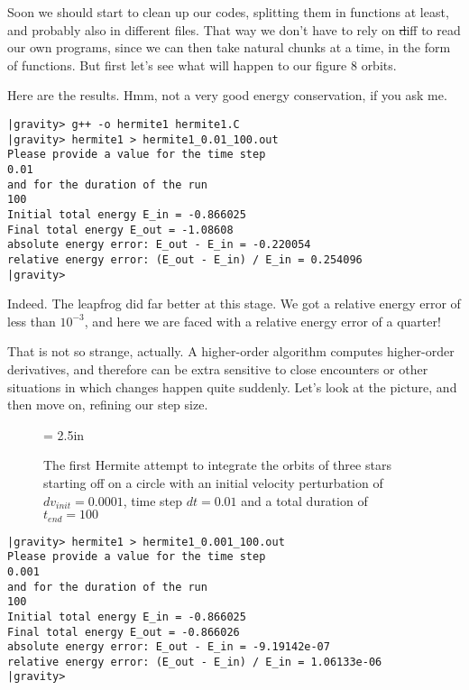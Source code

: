 \alice
Soon we should start to clean up our codes, splitting them in
functions at least, and probably also in different files.  That way we
don't have to rely on {\st diff} to read our own programs, since we
can then take natural chunks at a time, in the form of functions.  But
first let's see what will happen to our figure 8 orbits.

\bob
Here are the results.  Hmm, not a very good energy conservation, if
you ask me.

\cba

\begin{small}
\begin{verbatim}
|gravity> g++ -o hermite1 hermite1.C
|gravity> hermite1 > hermite1_0.01_100.out
Please provide a value for the time step
0.01
and for the duration of the run
100
Initial total energy E_in = -0.866025
Final total energy E_out = -1.08608
absolute energy error: E_out - E_in = -0.220054
relative energy error: (E_out - E_in) / E_in = 0.254096
|gravity>
\end{verbatim}
\end{small}

\abc

\carol
Indeed.  The leapfrog did far better at this stage.  We got a relative
energy error of less than $10^{-3}$, and here we are faced with a relative
energy error of a quarter!

\alice
That is not so strange, actually.  A higher-order algorithm computes
higher-order derivatives, and therefore can be extra sensitive to
close encounters or other situations in which changes happen quite
suddenly.  Let's look at the picture, and then move on, refining our
step size.

\cba

\begin{figure}[htb]
\begin{center}
\epsfxsize = 2.5in
\caption[Three stars on a circle, Hermite, $dv_{init}=0.0001$, $dt = 0.01$,
$t_{end} = 100$]
{The first Hermite attempt to integrate the orbits of three stars
starting off on a circle with an initial velocity perturbation of 
$dv_{init}=0.0001$, time step $dt = 0.01$ and a total duration of
$t_{end} = 100$}
\label{fig:hermite1-0.01-100}
\end{center}
\end{figure}

\begin{small}
\begin{verbatim}
|gravity> hermite1 > hermite1_0.001_100.out
Please provide a value for the time step
0.001
and for the duration of the run
100
Initial total energy E_in = -0.866025
Final total energy E_out = -0.866026
absolute energy error: E_out - E_in = -9.19142e-07
relative energy error: (E_out - E_in) / E_in = 1.06133e-06
|gravity>
\end{verbatim}
\end{small}


